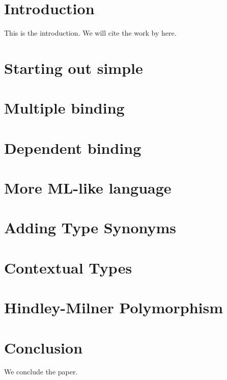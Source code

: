 \documentclass[format=acmlarge,review,anonymous]{acmart}\settopmatter{printfolios=true}
\begin{document}
\section{Introduction}

\TODO{} This is the introduction. We will cite the work by \citet{miller1988overview} here.

\section{Starting out simple}


\section{Multiple binding}


\section{Dependent binding}


\section{More ML-like language}


\section{Adding Type Synonyms}


\section{Contextual Types}


\section{Hindley-Milner Polymorphism}


\section{Conclusion}

\TODO{} We conclude the paper.


\end{document}
